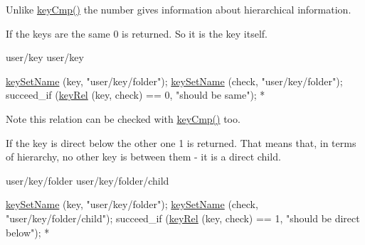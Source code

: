 Unlike \hyperlink{group__keytest_gaf6e66e12fe04d535a5d1c8218ced803e}{key\-Cmp()} the number gives information about hierarchical information.


\begin{DoxyItemize}
\item If the keys are the same 0 is returned. So it is the key itself. \begin{DoxyVerb}user/key
user/key
\end{DoxyVerb}

\end{DoxyItemize}


\begin{DoxyCode}
\hyperlink{group__keyname_ga7699091610e7f3f43d2949514a4b35d9}{keySetName} (key, \textcolor{stringliteral}{"user/key/folder"});
\hyperlink{group__keyname_ga7699091610e7f3f43d2949514a4b35d9}{keySetName} (check, \textcolor{stringliteral}{"user/key/folder"});
succeed\_if (\hyperlink{group__keytest_ga6bb0f95ac34ce9c42d61bb35a76139d0}{keyRel} (key, check) == 0, \textcolor{stringliteral}{"should be same"});
 *
\end{DoxyCode}


\begin{DoxyNote}{Note}
this relation can be checked with \hyperlink{group__keytest_gaf6e66e12fe04d535a5d1c8218ced803e}{key\-Cmp()} too.
\end{DoxyNote}

\begin{DoxyItemize}
\item If the key is direct below the other one 1 is returned. That means that, in terms of hierarchy, no other key is between them -\/ it is a direct child. \begin{DoxyVerb}user/key/folder
user/key/folder/child
\end{DoxyVerb}

\end{DoxyItemize}


\begin{DoxyCode}
\hyperlink{group__keyname_ga7699091610e7f3f43d2949514a4b35d9}{keySetName} (key, \textcolor{stringliteral}{"user/key/folder"});
\hyperlink{group__keyname_ga7699091610e7f3f43d2949514a4b35d9}{keySetName} (check, \textcolor{stringliteral}{"user/key/folder/child"});
succeed\_if (\hyperlink{group__keytest_ga6bb0f95ac34ce9c42d61bb35a76139d0}{keyRel} (key, check) == 1, \textcolor{stringliteral}{"should be direct below"});
 *
\end{DoxyCode}



